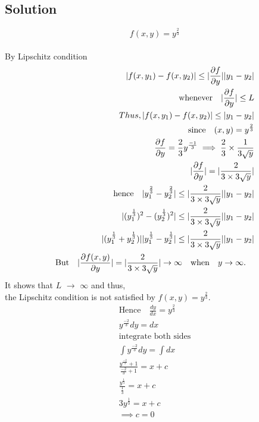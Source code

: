 \documentclass[a4paper, 12pt]{article}
\begin{document}
\subsection{Solution}
$$ f(x,y) = y^\frac{2}{3} $$\\
By Lipschitz condition 
\begin{eqnarray}
\nonumber \arrowvert f(x, y_1) - f(x, y_2) \arrowvert \le \arrowvert \frac{\partial f}{\partial y} \arrowvert  \arrowvert y_1 - y_2 \arrowvert \\
\nonumber \text{whenever}\quad  \arrowvert \frac{\partial f}{\partial y} \arrowvert \le L \\
Thus, 
\nonumber \arrowvert f(x, y_1) - f(x, y_2) \arrowvert \le \arrowvert y_1 - y_2 \arrowvert  \\
\nonumber \text{since} \quad (x,y) = y^\frac{2}{3}\\
\nonumber \frac{\partial f}{\partial y} = \frac{2}{3}y^\frac{-1}{3} \implies \frac{2}{3} \times \frac{1}{3\sqrt{y}}\\
\nonumber \arrowvert \frac{\partial f}{\partial y} \arrowvert = \arrowvert \frac{2}{3\times 3\sqrt{y}} \arrowvert\\
\nonumber \text{hence} \quad
\nonumber \arrowvert y^\frac{2}{3}_1 - y^\frac{2}{3}_2 \arrowvert \le \arrowvert \frac{2}{3\times 3\sqrt{y}} \arrowvert \arrowvert y_1 - y_2 \arrowvert\\
\nonumber \arrowvert (y^\frac{1}{3}_1)^2 - (y^\frac{1}{3}_2)^2 \arrowvert \le \arrowvert \frac{2}{3\times 3\sqrt{y}} \arrowvert \arrowvert y_1 - y_2 \arrowvert \\
\nonumber \arrowvert (y^\frac{1}{3}_1 + y^\frac{1}{3}_2)\arrowvert \arrowvert y^\frac{1}{3}_1 - y^\frac{1}{3}_2 \arrowvert \le \arrowvert \frac{2}{3\times 3\sqrt{y}} \arrowvert \arrowvert y_1 - y_2 \arrowvert\\
\nonumber \text{But} \quad
\nonumber \arrowvert \frac{\partial f(x,y)}{\partial y} \arrowvert = \arrowvert \frac{2}{3\times 3\sqrt{y}} \arrowvert \rightarrow \infty \quad \text{when} \quad y \rightarrow \infty .\quad 
\end{eqnarray} It shows that $L$ $\rightarrow $ $\infty$ and thus,\\
the Lipschitz condition is not satisfied by $f(x,y) = y^\frac{2}{3}$.
\begin{eqnarray}
\nonumber \text{Hence}\quad \frac{dy}{dx} = y^\frac{2}{3}\\
\nonumber y^\frac{-2}{3} dy = dx \\
\nonumber \text{integrate both sides} \\
\nonumber \int y^\frac{-2}{3} dy = \int dx \\
\nonumber \frac{y^\frac{-2}{3}+1}{\frac{-2}{3}+1}  = x + c \\
\nonumber \frac{y^\frac{1}{3}}{\frac{1}{3}} = x + c \\
\nonumber 3y^\frac{1}{3} = x + c \\
\nonumber \implies c = 0 
\end{eqnarray}
\end{document}

